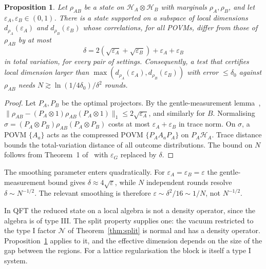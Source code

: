 \documentclass[11pt]{article}
\newtheorem{proposition}{Proposition}[section]
\theoremstyle{definition}\newtheorem{definition}{Definition}[section]
\theoremstyle{remark}\newtheorem*{remark}{Remark}
\newcommand{\Hil}{\mathcal H}
\newcommand{\N}{\mathcal N}
\begin{document}
\begin{proposition}
\label{prop:compress}
Let $\rho_{AB}$ be a state on $\Hil_A\otimes\Hil_B$ with marginals $\rho_A,\rho_B$, and let $\varepsilon_A,\varepsilon_B\in(0,1)$. There is a state supported on a
subspace of local dimensions $d_{\rho_A}(\varepsilon_A)$ and $d_{\rho_B}(\varepsilon_B)$ whose correlations, for all POVMs, differ from those of $\rho_{AB}$
by at most
\begin{equation}
\delta=2(\sqrt{\varepsilon_A}+\sqrt{\varepsilon_B})+\varepsilon_A+\varepsilon_B
\end{equation}
in total variation, for every pair of settings. Consequently, a test that certifies local dimension larger than
$\max(d_{\rho_A}(\varepsilon_A),d_{\rho_B}(\varepsilon_B))$ with error $\le\delta_0$ against $\rho_{AB}$ needs $N\gtrsim\ln(1/4\delta_0)/\delta^2$ rounds.
\end{proposition}

\begin{proof}
Let $P_A,P_B$ be the optimal projectors. By the gentle-measurement lemma~\cite{Winter},
$\|\rho_{AB}-(P_A\otimes1)\rho_{AB}(P_A\otimes1)\|_1\le2\sqrt{\varepsilon_A}$, and similarly for $B$. Normalising $\sigma=(P_A\otimes P_B)\rho_{AB}(P_A\otimes P_B)$ costs at
most $\varepsilon_A+\varepsilon_B$ in trace norm. On $\sigma$, a POVM $\{A_a\}$ acts as the compressed POVM $\{P_AA_aP_A\}$ on $P_A\Hil_A$. Trace distance
bounds the total-variation distance of all outcome distributions. The bound on $N$ follows from Theorem~1 of~\cite{Chen2026_certify}
with $\varepsilon_G$ replaced by $\delta$.
\end{proof}

The smoothing parameter enters quadratically. For $\varepsilon_A=\varepsilon_B=\varepsilon$ the gentle-measurement bound gives $\delta\approx4\sqrt\varepsilon$, while
$N$ independent rounds resolve $\delta\sim N^{-1/2}$. The relevant smoothing is therefore $\varepsilon\sim\delta^2/16\sim1/N$, not $N^{-1/2}$.

In QFT the reduced state on a local algebra is not a density operator, since the algebra is of type III. The split
property supplies one: the vacuum restricted to the type I factor $\N$ of Theorem~\ref{thm:split} is normal and has a density
operator. Proposition~\ref{prop:compress} applies to it, and the effective dimension depends on the size of the gap between
the regions. For a lattice regularisation the block is itself a type I system.
\end{document}
